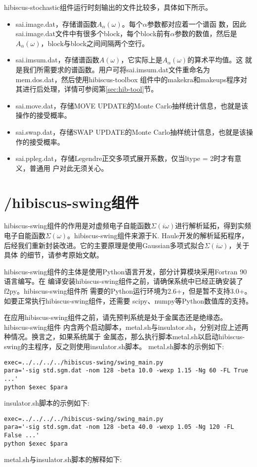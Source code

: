 hibiscus-stochastic组件运行时刻输出的文件比较多，具体如下所示。

\begin{itemize}
\item sai.image.dat，存储谱函数$A_{\alpha}(\omega)$。每个$\alpha$参数都对应着一个谱函
数，因此sai.image.dat文件中有很多个block，每个block前有$\alpha$参数的数值，然后是
$A_{\alpha}(\omega)$，block与block之间间隔两个空行。
\item sai.imsum.dat，存储谱函数$A(\omega)$，它实际上是$A_{\alpha}(\omega)$的算术平均值。这
就是我们所需要求的谱函数。用户可将sai.imsum.dat文件重命名为mem.dos.dat，然后使用hibiscus-toolbox
组件中的makekra和makeups程序对其进行后处理，详情可参阅第\ref{sec:hib-tool}节。
\item sai.move.dat，存储MOVE UPDATE的Monte Carlo抽样统计信息，也就是该操作的接受概率。
\item sai.swap.dat，存储SWAP UPDATE的Monte Carlo抽样统计信息，也就是该操作的接受概率。
\item sai.ppleg.dat，存储Legendre正交多项式展开系数，仅当ltype = 2时才有意义，普通用
户对此无须关心。
\end{itemize}

\section{{\hibiscus}/hibiscus-swing组件}
\label{sec:hib-swing}

hibiscus-swing组件的作用是对虚频电子自能函数$\Sigma(i\omega)$进行解析延拓，得到实频
电子自能函数$\Sigma(\omega)$。hibiscus-swing组件来源于K. Haule开发的解析延拓程序\cite{haule:195107}，
后经我们重新封装改进。它的主要原理是使用Gaussian多项式拟合$\Sigma(i\omega)$，关于具体
的细节，请参考原始文献。

hibiscus-swing组件的主体是使用Python语言开发，部分计算模块采用Fortran 90语言编写。在
编译安装hibiscus-swing组件之前，请确保系统中已经正确安装了f2py。hibiscus-swing组件所
需要的Python运行环境为2.6+，但是暂不支持3.0+。如要正常执行hibiscus-swing组件，还需要
scipy、numpy等Python数值库的支持。

在应用hibiscus-swing组件之前，请先预判系统是处于金属态还是绝缘态。hibiscus-swing组件
内含两个启动脚本，metal.sh与insulator.sh，分别对应上述两种情况。换言之，如果系统属于
金属态，那么执行脚本metal.sh以启动hibiscus-swing的主程序，反之则使用insulator.sh脚本。
metal.sh脚本的示例如下:
\begin{lstlisting}[frame=single]
exec=../../../../hibiscus-swing/swing_main.py
para='-sig std.sgm.dat -nom 128 -beta 10.0 -wexp 1.15 -Ng 60 -FL True ...'
python $exec $para
\end{lstlisting}
insulator.sh脚本的示例如下:
\begin{lstlisting}[frame=single]
exec=../../../../hibiscus-swing/swing_main.py
para='-sig std.sgm.dat -nom 128 -beta 40.0 -wexp 1.05 -Ng 120 -FL False ...'
python $exec $para
\end{lstlisting}
metal.sh与insulator.sh脚本的解释如下:

